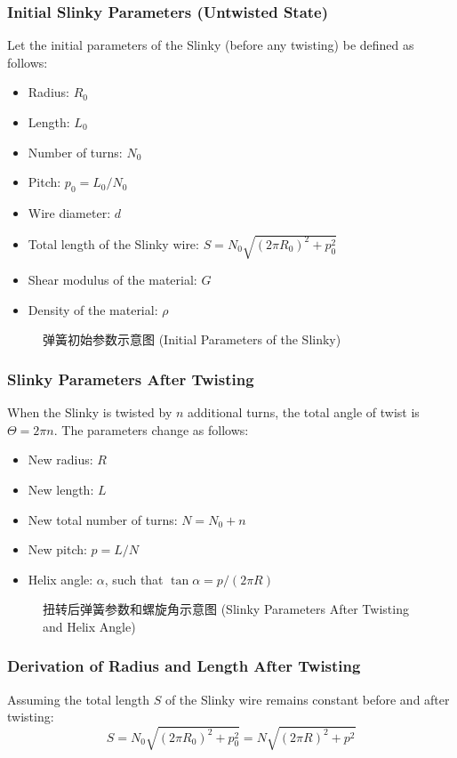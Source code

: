 \documentclass{mcmthesis}  %
\begin{document}
\subsubsection{Initial Slinky Parameters (Untwisted State)}
Let the initial parameters of the Slinky (before any twisting) be defined as follows:
\begin{itemize}
    \item Radius: \(R_0\)
    \item Length: \(L_0\)
    \item Number of turns: \(N_0\)
    \item Pitch: \(p_0 = L_0 / N_0\)
    \item Wire diameter: \(d\)
    \item Total length of the Slinky wire: \(S = N_0 \sqrt{(2\pi R_0)^2 + p_0^2}\)
    \item Shear modulus of the material: \(G\)
    \item Density of the material: \(\rho\)
\end{itemize}

\begin{figure}[h!]
    \centering
    \caption{弹簧初始参数示意图 (Initial Parameters of the Slinky)}
    \label{fig:initial_params}
\end{figure}

\subsubsection{Slinky Parameters After Twisting}
When the Slinky is twisted by \(n\) additional turns, the total angle of twist is \(\Theta = 2\pi n\). The parameters change as follows:
\begin{itemize}
    \item New radius: \(R\)
    \item New length: \(L\)
    \item New total number of turns: \(N = N_0 + n\)
    \item New pitch: \(p = L / N\)
    \item Helix angle: \(\alpha\), such that \(\tan \alpha = p / (2\pi R)\)
\end{itemize}

\begin{figure}[h!]
    \centering
    \caption{扭转后弹簧参数和螺旋角示意图 (Slinky Parameters After Twisting and Helix Angle)}
    \label{fig:twisted_params}
\end{figure}

\subsubsection{Derivation of Radius and Length After Twisting}
Assuming the total length \(S\) of the Slinky wire remains constant before and after twisting:
\[ S = N_0 \sqrt{(2\pi R_0)^2 + p_0^2} = N \sqrt{(2\pi R)^2 + p^2} \]
\end{document}
